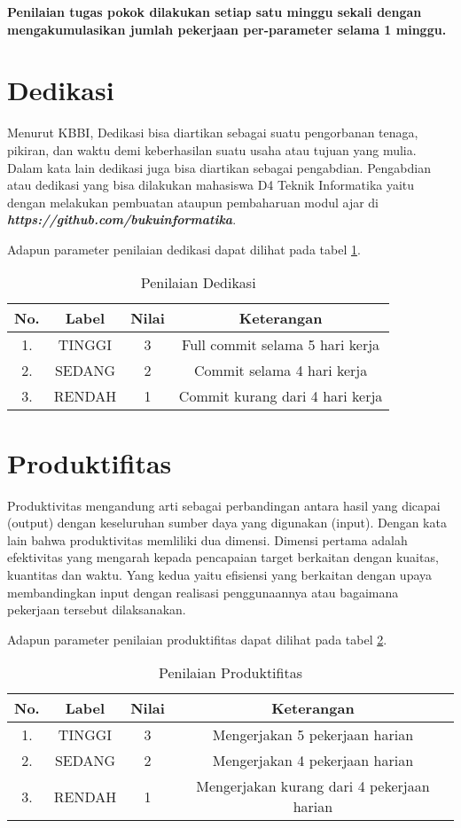 \textbf{Penilaian tugas pokok dilakukan setiap satu minggu sekali dengan mengakumulasikan jumlah pekerjaan per-parameter selama 1 minggu.}

\section{Dedikasi}

Menurut KBBI, Dedikasi bisa diartikan sebagai suatu pengorbanan tenaga, pikiran, dan waktu demi keberhasilan suatu usaha atau tujuan yang mulia. Dalam kata lain dedikasi juga bisa diartikan sebagai pengabdian. Pengabdian atau dedikasi yang bisa dilakukan mahasiswa D4 Teknik Informatika yaitu dengan melakukan pembuatan ataupun pembaharuan modul ajar di \textbf{\textit{https://github.com/bukuinformatika}}.

Adapun parameter penilaian dedikasi dapat dilihat pada tabel \ref{tab:nilaidedikasi}.

\begin{table}[H]
\caption{Penilaian Dedikasi}
\centering
\begin{tabular}{|c|c|c|c|}
\hline
\textbf{No.}&\textbf{Label}&\textbf{Nilai}&\textbf{Keterangan}\\
\hline
1.&TINGGI&3&Full commit selama 5 hari kerja\\
\hline
2.&SEDANG&2&Commit selama 4 hari kerja\\
\hline
3.&RENDAH&1&Commit kurang dari 4 hari kerja\\
\hline
\end{tabular}
\label{tab:nilaidedikasi}
\end{table}

\section{Produktifitas}
Produktivitas mengandung arti sebagai perbandingan antara hasil yang dicapai (output) dengan keseluruhan sumber daya yang digunakan (input). Dengan kata lain bahwa produktivitas memliliki dua dimensi. Dimensi pertama adalah efektivitas yang mengarah kepada pencapaian target berkaitan dengan kuaitas, kuantitas dan waktu. Yang kedua yaitu efisiensi yang berkaitan dengan upaya membandingkan input dengan realisasi penggunaannya atau bagaimana pekerjaan tersebut dilaksanakan.

Adapun parameter penilaian produktifitas dapat dilihat pada tabel \ref{tab:nilaiproduktifitas}.

\begin{table}[H]
\caption{Penilaian Produktifitas}
\centering
\begin{tabular}{|c|c|c|c|}
\hline
\textbf{No.}&\textbf{Label}&\textbf{Nilai}&\textbf{Keterangan}\\
\hline
1.&TINGGI&3&Mengerjakan 5 pekerjaan harian\\
\hline
2.&SEDANG&2&Mengerjakan 4 pekerjaan harian\\
\hline
3.&RENDAH&1&Mengerjakan kurang dari 4 pekerjaan harian\\
\hline
\end{tabular}
\label{tab:nilaiproduktifitas}
\end{table}

